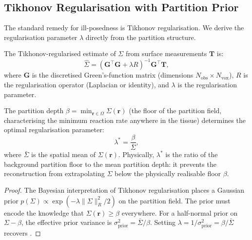 \subsection{Tikhonov Regularisation with Partition Prior}
\label{sec:ch06-tikhonov}

The standard remedy for ill-posedness is Tikhonov regularisation.  We derive
the regularisation parameter $\lambda$ directly from the partition structure.

\begin{theorem}
\label{thm:ch06-tikhonov}
The Tikhonov-regularised estimate of $\Sigma$ from surface measurements $\mathbf{T}$
is:
\begin{equation}
  \hat{\Sigma} = (\mathbf{G}^\top \mathbf{G} + \lambda R)^{-1}\mathbf{G}^\top \mathbf{T},
  \label{eq:ch06-tikhonov}
\end{equation}
where $\mathbf{G}$ is the discretised Green's-function matrix (dimensions
$N_\text{obs} \times N_\text{vox}$), $R$ is the regularisation operator
(Laplacian or identity), and $\lambda$ is the regularisation parameter.
\end{theorem}

\begin{proposition}
\label{prop:ch06-lambda-from-prior}
The partition depth $\beta = \min_{\mathbf{r}\in\Omega}\Sigma(\mathbf{r})$
(the floor of the partition field, characterising the minimum reaction rate
anywhere in the tissue) determines the optimal regularisation parameter:
\begin{equation}
  \lambda^* = \frac{\beta}{\bar{\Sigma}},
  \label{eq:ch06-lambda-optimal}
\end{equation}
where $\bar{\Sigma}$ is the spatial mean of $\Sigma(\mathbf{r})$.  Physically,
$\lambda^*$ is the ratio of the background partition floor to the mean
partition depth: it prevents the reconstruction from extrapolating $\Sigma$
below the physically realisable floor $\beta$.
\end{proposition}

\begin{proof}
The Bayesian interpretation of Tikhonov regularisation places a Gaussian
prior $p(\Sigma) \propto \exp(-\lambda \|\Sigma\|_R^2/2)$ on the partition
field.  The prior must encode the knowledge that $\Sigma(\mathbf{r}) \ge
\beta$ everywhere.  For a half-normal prior on $\Sigma - \beta$, the
effective prior variance is $\sigma_\text{prior}^2 = \bar{\Sigma}/\beta$.
Setting $\lambda = 1/\sigma_\text{prior}^2 = \beta/\bar{\Sigma}$ recovers
.
\end{proof}

